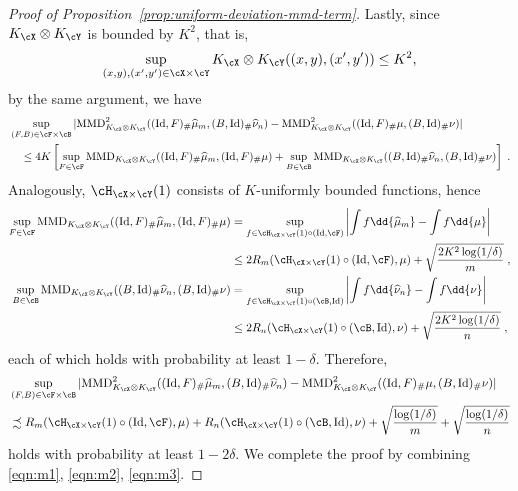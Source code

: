 \documentclass[11pt]{article}
\begin{document}
\begin{proof}[Proof of Proposition~\ref{prop:uniform-deviation-mmd-term}]
	Lastly, since $K_{\cX} \otimes K_{\cY}$ is bounded by $K^2$, that is, 
	\begin{equation*}
		\sup_{(x, y), (x', y') \in \cX \times \cY} K_{\cX} \otimes K_{\cY}((x, y), (x', y')) \le K^2,
	\end{equation*}
	by the same argument, we have
	\begin{equation*}
		\begin{split}
			& \sup_{(F,B) \in \cF \times \cB} |\mathrm{MMD}^2_{K_{\cX} \otimes K_{\cY}} ((\mathrm{Id}, F)_{\#}\widehat{\mu}_m, (B, \mathrm{Id})_{\#} \widehat{\nu}_n) - \mathrm{MMD}^2_{K_{\cX} \otimes K_{\cY}} ((\mathrm{Id}, F)_{\#}\mu, (B, \mathrm{Id})_{\#} \nu)| \\
			&\quad \le 4 K \left[\sup_{F \in \cF} \mathrm{MMD}_{K_{\cX} \otimes K_{\cY}} ((\mathrm{Id}, F)_{\#}\widehat{\mu}_m, (\mathrm{Id}, F)_{\#}\mu) + \sup_{B \in \cB} \mathrm{MMD}_{K_{\cX} \otimes K_{\cY}} ((B, \mathrm{Id})_{\#} \widehat{\nu}_n, (B, \mathrm{Id})_{\#} \nu)\right] \;.
		\end{split}
	\end{equation*}
	Analogously, $\cH_{\cX \times \cY}(1)$ consists of $K$-uniformly bounded functions, hence
	\begin{align*}
		\sup_{F \in \cF} \mathrm{MMD}_{K_{\cX} \otimes K_{\cY}} ((\mathrm{Id}, F)_{\#}\widehat{\mu}_m, (\mathrm{Id}, F)_{\#}\mu)
		& = \sup_{f \in \cH_{\cX \times \cY}(1) \circ (\mathrm{Id}, \cF)} \left|\int f \dd{\widehat{\mu}_{m}} - \int f \dd{\mu} \right| \\
		& \le 2 R_m(\cH_{\cX \times \cY}(1) \circ (\mathrm{Id}, \cF), \mu) + \sqrt{\frac{2 K^2 \log(1/\delta)}{m}} \;, \\
		\sup_{B \in \cB} \mathrm{MMD}_{K_{\cX} \otimes K_{\cY}} ((B, \mathrm{Id})_{\#} \widehat{\nu}_n, (B, \mathrm{Id})_{\#} \nu)
		& = \sup_{f \in \cH_{\cX \times \cY}(1) \circ (\cB, \mathrm{Id})} \left|\int f \dd{\widehat{\nu}_{n}} - \int f \dd{\nu} \right| \\
		& \le 2 R_n(\cH_{\cX \times \cY}(1) \circ (\cB, \mathrm{Id}), \nu) + \sqrt{\frac{2 K^2 \log(1/\delta)}{n}} \;,
	\end{align*}	
	each of which holds with probability at least $1 - \delta$. Therefore,
	\begin{equation}
		\begin{split}		
			\label{eqn:m3}
			& \sup_{(F,B) \in \cF \times \cB} |\mathrm{MMD}^2_{K_{\cX} \otimes K_{\cY}} ((\mathrm{Id}, F)_{\#}\widehat{\mu}_m, (B, \mathrm{Id})_{\#} \widehat{\nu}_n) - \mathrm{MMD}^2_{K_{\cX} \otimes K_{\cY}} ((\mathrm{Id}, F)_{\#}\mu, (B, \mathrm{Id})_{\#} \nu)| \\
			& \precsim R_m(\cH_{\cX \times \cY}(1) \circ (\mathrm{Id}, \cF), \mu) + R_n(\cH_{\cX \times \cY}(1) \circ (\cB, \mathrm{Id}), \nu) + \sqrt{\frac{\log(1/\delta)}{m}} + \sqrt{\frac{\log(1/\delta)}{n}}
		\end{split}
	\end{equation}
	holds with probability at least $1 - 2 \delta$. We complete the proof by combining \eqref{eqn:m1}, \eqref{eqn:m2}, \eqref{eqn:m3}.
\end{proof}
\end{document}
